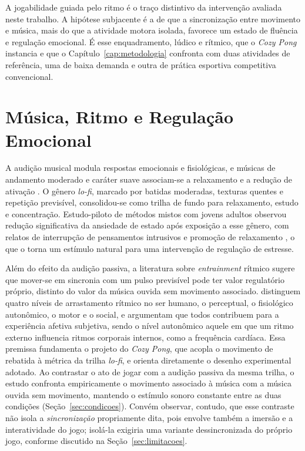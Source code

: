 A jogabilidade guiada pelo ritmo é o traço distintivo da intervenção avaliada neste trabalho. A hipótese subjacente é a de que a sincronização entre movimento e música, mais do que a atividade motora isolada, favorece um estado de fluência e regulação emocional. É esse enquadramento, lúdico e rítmico, que o \textit{Cozy Pong} instancia e que o Capítulo~\ref{cap:metodologia} confronta com duas atividades de referência, uma de baixa demanda e outra de prática esportiva competitiva convencional.

\section{Música, Ritmo e Regulação Emocional}\label{sec:fund-musica}

A audição musical modula respostas emocionais e fisiológicas, e músicas de andamento moderado e caráter suave associam-se a relaxamento e a redução de ativação \citep{Trost2017}. O gênero \textit{lo-fi}, marcado por batidas moderadas, texturas quentes e repetição previsível, consolidou-se como trilha de fundo para relaxamento, estudo e concentração. Estudo-piloto de métodos mistos com jovens adultos observou redução significativa da ansiedade de estado após exposição a esse gênero, com relatos de interrupção de pensamentos intrusivos e promoção de relaxamento \citep{Dsouza2024}, o que o torna um estímulo natural para uma intervenção de regulação de estresse.

Além do efeito da audição passiva, a literatura sobre \textit{entrainment} rítmico sugere que mover-se em sincronia com um pulso previsível pode ter valor regulatório próprio, distinto do valor da música ouvida sem movimento associado. \citet{Trost2017} distinguem quatro níveis de arrastamento rítmico no ser humano, o perceptual, o fisiológico autonômico, o motor e o social, e argumentam que todos contribuem para a experiência afetiva subjetiva, sendo o nível autonômico aquele em que um ritmo externo influencia ritmos corporais internos, como a frequência cardíaca. Essa premissa fundamenta o projeto do \textit{Cozy Pong}, que acopla o movimento de rebatida à métrica da trilha \textit{lo-fi}, e orienta diretamente o desenho experimental adotado. Ao contrastar o ato de jogar com a audição passiva da mesma trilha, o estudo confronta empiricamente o movimento associado à música com a música ouvida sem movimento, mantendo o estímulo sonoro constante entre as duas condições (Seção~\ref{sec:condicoes}). Convém observar, contudo, que esse contraste não isola a \emph{sincronização} propriamente dita, pois envolve também a imersão e a interatividade do jogo; isolá-la exigiria uma variante dessincronizada do próprio jogo, conforme discutido na Seção~\ref{sec:limitacoes}.

